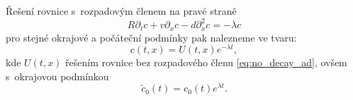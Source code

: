 \documentclass{article}
\def\prtl{\partial}
\begin{document}
Řešení rovnice s~rozpadovým členem na pravé straně
\[
 R\prtl_t c + v \prtl_x c - d \prtl^2_x c = - \lambda c
\]
pro stejné okrajové a počáteční podmínky pak nalezneme ve tvaru:
\[
    c(t,x) = U(t,x) e^{-\lambda t},
\]
kde $U(t,x)$ řešením rovnice bez rozpadového členu \eqref{eq:no_decay_ad}, ovšem s~okrajovou podmínkou
\[
    \tilde{c}_0(t) = c_0(t) e^{\lambda t}.
\]






\end{document}
